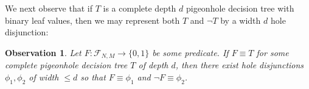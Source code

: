 \documentclass[11pt]{article}
\newtheorem{observation}{Observation}
\newcommand{\todo}[1]{\textcolor{red}{TODO: #1}}
\newcommand{\B}{\{0,1\}}
\begin{document}

We next observe that if $T$ is a complete depth $d$ pigeonhole decision tree with binary leaf values, then we may represent both $T$ and $\lnot T$ by a width $d$ hole disjunction:
\begin{observation}\label{obs:dt-to-disj}
Let $F: \mathcal{F}_{N,M} \to \B$ be some predicate. If $F \equiv T$ for some complete pigeonhole decision tree $T$ of depth $d$, then there exist hole disjunctions $\phi_1,\phi_2$ of width $\leq d$ so that $F \equiv \phi_1$ and $\lnot F \equiv \phi_2$.
\end{observation}
\end{document}
